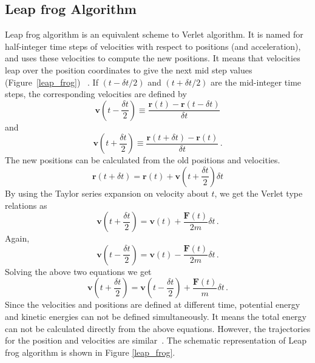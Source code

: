 \subsection{Leap frog Algorithm}
Leap frog algorithm  is an equivalent scheme to Verlet algorithm. It is named for half-integer time steps of velocities with respect to positions (and acceleration), and uses these velocities to compute the new positions. 
It means that velocities leap over the position coordinates to give the next mid step values (Figure~\ref{leap_frog}) ~\citep{Frenkel2002}. If $(t-\delta t/2)$ and $(t+\delta t/2)$ are the mid-integer time steps, the corresponding velocities are defined by
\begin{equation}
\textbf{v}\left(t-\frac{\delta t}{2}\right) \equiv \frac{\textbf{r}(t)-\textbf{r}(t-\delta t)}{\delta t}
\label{v-minus}
\end{equation}
and \begin{equation}
\textbf{v}\left(t+\frac{\delta t}{2}\right) \equiv \frac{\textbf{r}(t + \delta t) - \textbf{r}(t)}{\delta t}\,.
\label{v-plus}
\end{equation}
The new positions can be calculated from  the old positions and velocities. 
\begin{equation}
\textbf{r}(t+\delta t) = \textbf{r}(t) + \textbf{v}\left(t+\frac{\delta t}{2}\right) \delta t  
\end{equation}
By using the Taylor series expansion on velocity about $t$, we get the Verlet type relations as
\begin{equation}
\textbf{v}\left(t+\frac{\delta t}{2}\right) = \textbf{v}(t) + \frac{\textbf{F}(t)}{2 m} \delta t\, .
\end{equation}
Again,
\begin{equation}
\textbf{v}\left(t-\frac{\delta t}{2}\right)= \textbf{v}(t) - \frac{\textbf{F}(t)}{2 m} \delta t\, .
\end{equation}
Solving the above two equations we get
\begin{equation}\label{leap_v}
\textbf{v}\left(t+\frac{\delta t}{2}\right) = \textbf{v}\left(t-\frac{\delta t}{2}\right) + \frac{\textbf{F}(t)}{m} \delta t\, .
\end{equation}
Since the velocities and positions are defined at different time, potential energy and kinetic energies can not be defined simultaneously. It means the total energy can not be calculated directly from the above equations. However, the trajectories for the position and velocities are similar~\citep{Ercolessi1997, Bergethon1998}. The schematic representation of Leap frog algorithm is shown in Figure \ref{leap_frog}.


